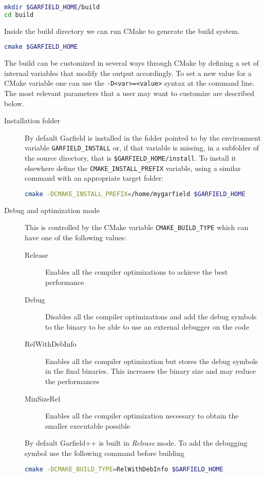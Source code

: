 \begin{lstlisting}[language=bash]
mkdir $GARFIELD_HOME/build
cd build
\end{lstlisting}

Inside the build directory we can run CMake to generate the build system.
\begin{lstlisting}[language=bash]
cmake $GARFIELD_HOME
\end{lstlisting}

The build can be customized in several ways through CMake 
by defining a set of internal variables that modify the output accordingly.
To set a new value for a CMake variable one can use the 
\texttt{-D<var>=<value>} syntax at the command line. 
The most relevant parameters that a user may want to customize are 
described below.
\begin{description}
	\item[Installation folder] 
  By default Garfield is installed in the folder pointed to by the environment variable \texttt{GARFIELD\_INSTALL} or, if that variable is missing, in a subfolder of the source directory, that is \texttt{\$GARFIELD\_HOME/install}. To install it elsewhere define the \texttt{CMAKE\_INSTALL\_PREFIX} variable, using a similar command with an appropriate target folder:
\begin{lstlisting}[language=bash]
cmake -DCMAKE_INSTALL_PREFIX=/home/mygarfield $GARFIELD_HOME
\end{lstlisting} 
	\item[Debug and optimization mode] 
  This is controlled by the CMake variable \texttt{CMAKE\_BUILD\_TYPE} which can have one of the following values: 
	\begin{description}
		\item[Release] Enables all the compiler optimizations to achieve the best performance
		\item[Debug] Disables all the compiler optimizations and add the debug symbols to the binary to be able to use an external debugger on the code
		\item[RelWithDebInfo] Enables all the compiler optimization but stores the debug symbols in the final binaries. This increases the binary size and may reduce the performances
		\item[MinSizeRel] Enables all the compiler optimization necessary to obtain the smaller executable possible
	\end{description}
	By default Garfield++ is built in \emph{Release} mode. To add the debugging symbol use the following command before building
\begin{lstlisting}[language=bash]
cmake -DCMAKE_BUILD_TYPE=RelWithDebInfo $GARFIELD_HOME
\end{lstlisting}
\end{description}

